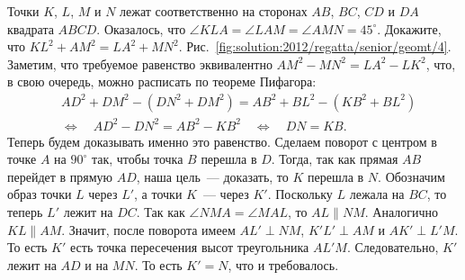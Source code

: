 \problem
Точки $K$, $L$, $M$ и $N$ лежат соответственно на сторонах
$AB$, $BC$, $CD$ и $DA$ квадрата $ABCD$.
Оказалось, что $\angle KLA = \angle LAM = \angle AMN = 45^\circ$.
Докажите, что $KL^2 + AM^2 = LA^2 + MN^2$.
%
\label{solution:2012/regatta/senior/geomt/4}%
Рис.~\ref{fig:solution:2012/regatta/senior/geomt/4}.
Заметим, что требуемое равенство эквивалентно
$AM^2 - MN^2 = LA^2 - LK^2$,
что, в свою очередь, можно расписать по теореме Пифагора:
\begin{align*}
&
    AD^2 + DM^2 - (DN^2 + DM^2) = AB^2 + BL^2 - (KB^2 + BL^2)
\\&\Leftrightarrow\quad
    AD^2 - DN^2 = AB^2 - KB^2
\quad\Leftrightarrow\quad
    DN = KB
.\end{align*}
Теперь будем доказывать именно это равенство.
Сделаем поворот с центром в точке $A$ на $90^\circ$ так, чтобы точка $B$
перешла в $D$.
Тогда, так как прямая $AB$ перейдет в прямую $AD$, наша цель~--- доказать, то
$K$ перешла в $N$.
Обозначим образ точки $L$ через $L'$, а точки $K$~--- через $K'$.
Поскольку $L$ лежала на $BC$, то теперь $L'$ лежит на $DC$.
Так как $\angle NMA = \angle MAL$, то $AL \parallel NM$.
Аналогично $KL \parallel AM$.
Значит, после поворота имеем
$AL' \perp NM$, $K'L' \perp AM$ и $AK' \perp L'M$.
То есть $K'$ есть точка пересечения высот треугольника $AL'M$.
Следовательно, $K'$ лежит на $AD$ и на $MN$.
То есть $K' = N$, что и требовалось.
\endproblem
